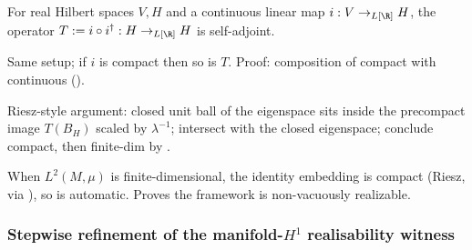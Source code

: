 \begin{lemma}[Phase 3.1 abstract resolvent: $T = i \circ i^{\dagger}$ is self-adjoint]
\label{lem:abstract-resolvent-self-adjoint}
For real Hilbert spaces $V, H$ and a continuous linear map
$i : V \to_{L[\R]} H$, the operator
$T := i \circ i^{\dagger} : H \to_{L[\R]} H$ is self-adjoint.
\leanok
\end{lemma}

\begin{lemma}
\label{lem:abstract-resolvent-compact}
Same setup; if $i$ is compact then so is $T$.  Proof: composition
of compact with continuous ().
\leanok
\end{lemma}

\begin{lemma}
\label{lem:abstract-resolvent-eigenspace-finite-dim}
Riesz-style argument: closed unit ball of the eigenspace sits
inside the precompact image $T(B_{H})$ scaled by $\lambda^{-1}$;
intersect with the closed eigenspace; conclude compact, then
finite-dim by
.
\leanok\mathlibok
\end{lemma}

\begin{lemma}
\label{lem:has-laplace-resolvent-finiteDim}
When $L^{2}(M, \mu)$ is finite-dimensional, the identity embedding
is compact (Riesz, via ), so
 is automatic.  Proves the
framework is non-vacuously realizable.
\leanok
\end{lemma}

\subsubsection*{Stepwise refinement of the manifold-$H^{1}$ realisability witness}
\label{subsubsec:manifold-H1-realisability}

